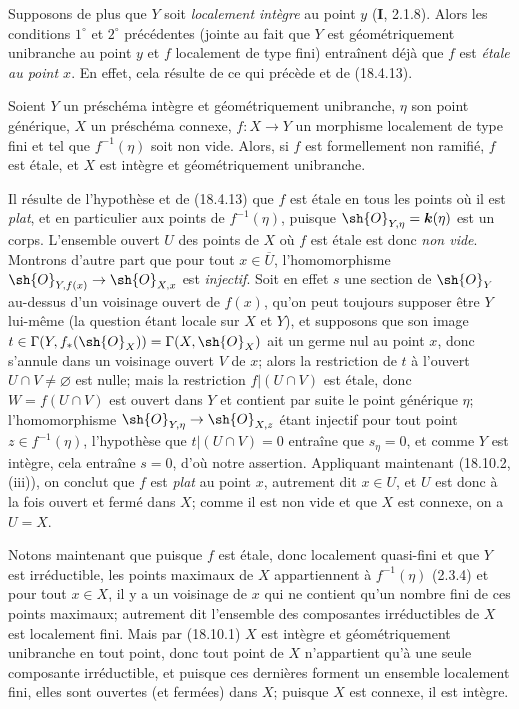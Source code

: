 \begin{remarks}[18.10.2]
\begin{enumerate}
Supposons de plus que $Y$ soit \emph{localement intègre} au point $y$ (\textbf{I}, 2.1.8). Alors les conditions $1^\circ$ et $2^\circ$ précédentes (jointe au fait que $Y$ est géométriquement unibranche au point $y$ et $f$ localement de type fini) entraînent déjà que $f$ est \emph{étale au point $x$}. En effet, cela résulte de ce qui précède et de (18.4.13).
\end{enumerate}
\end{remarks}

\begin{corollary}[18.10.3]
\label{IV.18.10.3}
Soient $Y$ un préschéma intègre et géométriquement unibranche, $\eta$ son point générique, $X$ un préschéma connexe, $f:X\to Y$ un morphisme localement de type fini et tel que $f^{-1}(\eta)$ soit non vide. Alors, si $f$ est formellement non ramifié, $f$ est étale, et $X$ est intègre et géométriquement unibranche.
\end{corollary}

Il résulte de l'hypothèse et de (18.4.13) que $f$ est étale en tous les points où il est \emph{plat}, et en particulier aux points de $f^{-1}(\eta)$, puisque $\sh{O}_{Y,\eta}=\boldsymbol{k}(\eta)$ est un corps. L'ensemble ouvert $U$ des points de $X$ où $f$ est étale est donc \emph{non vide}. Montrons d'autre part que pour tout $x\in\overline U$, l'homomorphisme $\sh{O}_{Y,f(x)}\to\sh{O}_{X,x}$ est \emph{injectif}. Soit en effet $s$ une section de $\sh{O}_Y$ au-dessus d'un voisinage ouvert de $f(x)$, qu'on peut toujours supposer être $Y$ lui-même (la question étant locale sur $X$ et $Y$), et supposons que son image $t\in\Gamma(Y,f_*(\sh{O}_X))=\Gamma(X,\sh{O}_X)$ ait un germe nul au point $x$, donc s'annule dans un voisinage ouvert $V$ de $x$; alors la restriction de $t$ à l'ouvert $U\cap V\neq\varnothing$ est nulle; mais la restriction $f|(U\cap V)$ est étale, donc $W=f(U\cap V)$ est ouvert dans $Y$ et contient par suite le point générique $\eta$; l'homomorphisme $\sh{O}_{Y,\eta}\to\sh{O}_{X,z}$ étant injectif pour tout point $z\in f^{-1}(\eta)$, l'hypothèse que $t|(U\cap V)=0$ entraîne que $s_\eta=0$, et comme $Y$ est intègre, cela entraîne $s=0$, d'où notre assertion. Appliquant maintenant (18.10.2, (iii)), on conclut que $f$ est \emph{plat} au point $x$, autrement dit $x\in U$, et $U$ est donc à la fois ouvert et fermé dans $X$; comme il est non vide et que $X$ est connexe, on a $U=X$.

Notons maintenant que puisque $f$ est étale, donc localement quasi-fini et que $Y$ est irréductible, les points maximaux de $X$ appartiennent à $f^{-1}(\eta)$ (2.3.4) et pour tout $x\in X$, il y a un voisinage de $x$ qui ne contient qu'un nombre fini de ces points maximaux; autrement dit l'ensemble des composantes irréductibles de $X$ est localement fini. Mais par (18.10.1) $X$ est intègre et géométriquement unibranche en tout point, donc tout point de $X$ n'appartient qu'à une seule composante irréductible, et puisque ces dernières forment un ensemble localement fini, elles sont ouvertes (et fermées) dans $X$; puisque $X$ est connexe, il est intègre.

